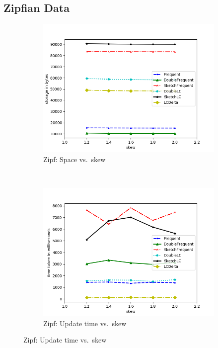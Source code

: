 \documentclass[sigconf,review=true,anonymous=true,screen]{acmart}
\begin{document}
\subsection{Zipfian Data}
\begin{figure}[!h]
\centering
\begin{subfigure}[b]{0.3\textwidth}
\includegraphics[width=\textwidth]{../Plots/storage_skew.png}
\caption{Zipf: Space vs.~skew}
\label{fig:zipspskew}
\end{subfigure}
~
\begin{subfigure}[b]{0.3\textwidth}
\includegraphics[width=\textwidth]{../Plots/time_skew.png}
\caption{Zipf: Update time vs.~skew}
\label{fig:ziptimskew}
\end{subfigure}


\end{figure}
\end{document}
